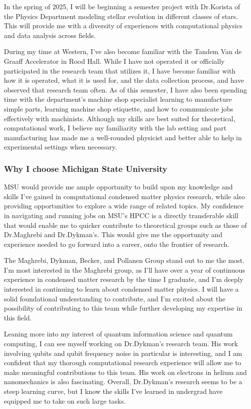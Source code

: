 \documentclass[11pt]{article}
\newcommand{\school}{Michigan State University}
\newcommand{\schoolabbr}{MSU}
\begin{document}
In the spring of 2025, I will be beginning a semester project with Dr.\@ Korista of the Physics Department modeling stellar evolution in different classes of stars. This will provide me with a diversity of experiences with computational physics and data analysis across fields.

During my time at Western, I've also become familiar with the Tandem Van de Graaff Accelerator in Rood Hall. While I have not operated it or officially participated in the research team that utilizes it, I have become familiar with how it is operated, what it is used for, and the data collection process, and have observed that research team often. As of this semester, I have also been spending time with the department's machine shop specialist learning to manufacture simple parts, learning machine shop etiquette, and how to communicate jobs effectively with machinists. Although my skills are best suited for theoretical, computational work, I believe my familiarity with the lab setting and part manufacturing has made me a well-rounded physicist and better able to help in experimental settings when necessary.

\subsubsection*{Why I choose \school{}}
\schoolabbr{} would provide me ample opportunity to build upon my knowledge and skills I've gained in computational condensed matter physics research, while also providing opportunities to explore a wide range of related topics. My confidence in navigating and running jobs on MSU's HPCC is a directly transferable skill that would enable me to quicker contribute to theoretical groups such as those of Dr.\@ Maghrebi and Dr.\@ Dykman's. This would give me the opportunity and experience needed to go forward into a career, onto the frontier of research.

The Maghrebi, Dykman, Becker, and Pollanen Group stand out to me the most. I'm most interested in the Maghrebi group, as I'll have over a year of continuous experience in condensed matter research by the time I graduate, and I'm deeply interested in continuing to learn about condensed matter physics. I will have a solid foundational understanding to contribute, and I'm excited about the possibility of contributing to this team while further developing my expertise in this field.

Leaning more into my interest of quantum information science and quantum computing, I can see myself working on Dr.\@ Dykman's research team. His work involving qubits and qubit frequency noise in particular is interesting, and I am confident that my thorough computational research experience will allow me to make meaningful contributions to this team. His work on electrons in helium and nanomechanics is also fascinating. Overall, Dr.\@ Dykman's research seems to be a steep learning curve, but I know the skills I've learned in undergrad have equipped me to take on such large tasks.
\end{document}

